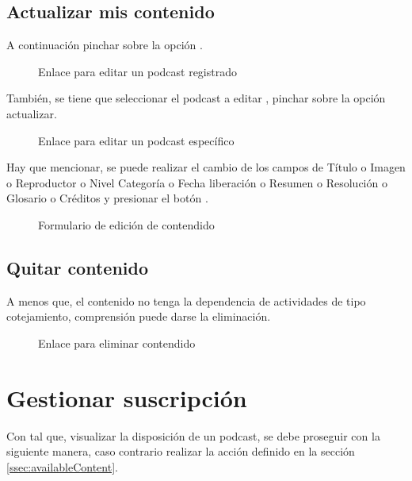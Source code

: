 \subsection{Actualizar mis contenido}

A continuación pinchar sobre la opción .

\begin{figure}[!ht]
\centering
		\caption{Enlace para editar un podcast registrado}
\end{figure}

También, se tiene que seleccionar el podcast a editar 
, pinchar sobre la opción actualizar.
 
\begin{figure}[!ht]
\centering
		\caption{Enlace para editar un podcast específico}
\end{figure}

Hay que mencionar, se puede realizar el cambio de los campos de Título o Imagen o
Reproductor o Nivel Categoría o Fecha liberación o Resumen o Resolución o Glosario
o Créditos y presionar el botón .

\begin{figure}[H]
\centering
		\caption{Formulario de edición de contendido}
\end{figure}

\subsection{Quitar contenido}

A menos que, el contenido no tenga la dependencia de actividades de tipo 
cotejamiento, comprensión puede darse la eliminación.

\begin{figure}[!ht]
\centering
		\caption{Enlace para eliminar contendido}
\end{figure}

\section{Gestionar suscripción}

Con tal que, visualizar la disposición de un podcast, se debe proseguir con
la siguiente manera, caso contrario realizar la acción definido en la sección
\ref{ssec:availableContent}.

